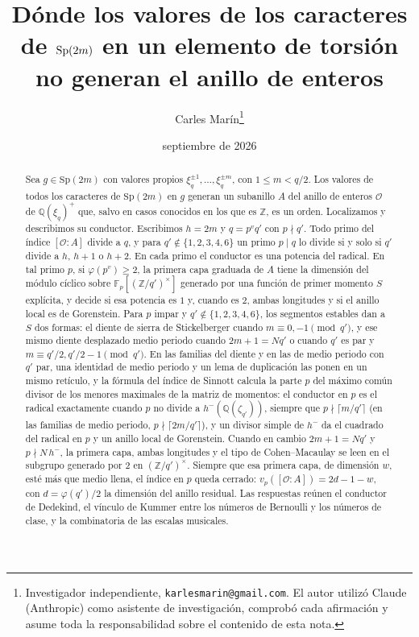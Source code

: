 \documentclass[11pt,a4paper]{article}
\title{\vspace{-1.4cm}\Large Dónde los valores de los caracteres de $\Sp(2m)$ en un elemento de torsión\\
no generan el anillo de enteros}
\author{\normalsize Carles Mar\'in\thanks{Investigador independiente, \texttt{karlesmarin@gmail.com}.
El autor utilizó Claude (Anthropic) como asistente de investigación, comprobó cada afirmación y asume toda la
responsabilidad sobre el contenido de esta nota.}}
\date{\normalsize septiembre de 2026}
\theoremstyle{definition}
\newcommand{\Sp}{\mathrm{Sp}}
\newcommand{\ZZ}{\mathbb{Z}}
\newcommand{\QQ}{\mathbb{Q}}
\newcommand{\FF}{\mathbb{F}}
\newcommand{\cO}{\mathcal{O}}
\begin{document}
\maketitle
\thispagestyle{empty}\enlargethispage{2pt}

\begin{abstract}
\noindent Sea $g\in\Sp(2m)$ con valores propios $\xi_q^{\pm1},\dots,\xi_q^{\pm m}$, con $1\le m<q/2$. Los valores de
todos los caracteres de $\Sp(2m)$ en $g$ generan un subanillo $A$ del anillo de enteros $\cO$ de $\QQ(\xi_q)^+$ que,
salvo en casos conocidos en los que es $\ZZ$, es un orden. Localizamos y describimos su conductor. Escribimos $h=2m$ y
$q=p^vq'$ con $p\nmid q'$. Todo primo del índice $[\cO:A]$ divide a $q$, y para $q'\notin\{1,2,3,4,6\}$ un primo
$p\mid q$ lo divide si y solo si $q'$ divide a $h$, $h+1$ o $h+2$. En cada primo el conductor es una potencia del
radical. En tal primo $p$, si $\varphi(p^v)\ge2$, la primera capa graduada de $A$ tiene la dimensión del módulo cíclico
sobre $\FF_p[(\ZZ/q')^\times]$ generado por una función de primer momento $S$ explícita, y decide si esa potencia es
$1$ y, cuando es $2$, ambas longitudes y si el anillo local es de Gorenstein. Para $p$ impar y
$q'\notin\{1,2,3,4,6\}$, los segmentos estables dan a $S$ dos formas: el diente de sierra de Stickelberger cuando
$m\equiv0,-1\pmod{q'}$, y ese mismo diente desplazado medio periodo cuando $2m+1=Nq'$ o cuando $q'$ es par y
$m\equiv q'/2,q'/2-1\pmod{q'}$. En las familias del diente y en las de medio periodo con $q'$ par, una identidad de
medio periodo y un lema de duplicación las ponen en un mismo retículo, y la fórmula del
índice de Sinnott calcula la parte $p$ del máximo común divisor de los menores
maximales de la matriz de momentos: el conductor en $p$ es el radical exactamente cuando $p$ no divide a
$h^-(\QQ(\zeta_{q'}))$, siempre que $p\nmid\lceil m/q'\rceil$ (en las familias de medio periodo, $p\nmid\lceil 2m/q'\rceil$), y un divisor simple de $h^-$ da el cuadrado del radical en $p$ y un anillo local de Gorenstein.
Cuando en cambio $2m+1=Nq'$ y $p\nmid N\,h^-$, la primera capa, ambas longitudes y el tipo de Cohen--Macaulay se leen
en el subgrupo generado por $2$ en $(\ZZ/q')^\times$. Siempre que esa primera capa, de dimensión $w$, esté más que
medio llena, el índice en $p$ queda cerrado: $v_p([\cO:A])=2d-1-w$, con $d=\varphi(q')/2$ la dimensión del anillo
residual. Las respuestas reúnen el conductor de Dedekind, el vínculo de Kummer
entre los números de Bernoulli y los números de clase, y la combinatoria de las escalas musicales.
\end{abstract}
\end{document}
